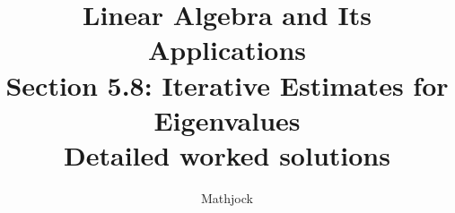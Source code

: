 
\title{\textbf{Linear Algebra and Its Applications}\\[0.3em]Section 5.8: Iterative Estimates for Eigenvalues\\[0.3em]\large Detailed worked solutions}
\author{Mathjock}
\date{}

\maketitle
\bookinfo
\tableofcontents
\clearpage
\renewcommand{\thesection}{5.\arabic{section}}
\renewcommand{\theHsection}{5.\arabic{section}}
\setcounter{section}{7}


